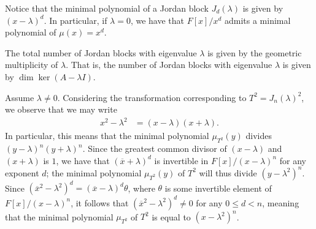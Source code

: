 \documentclass[10pt]{mypackage}
\begin{document}
Notice that the minimal polynomial of a Jordan block $J_d(\lambda)$ is given by $\left( x-\lambda \right)^{d}$. In particular, if $\lambda = 0$, we have that $F[x]/x^{d}$ admits a minimal polynomial of $\mu(x) = x^d$.
\begin{theorem}
  The total number of Jordan blocks with eigenvalue $\lambda$ is given by the geometric multiplicity of $\lambda$. That is, the number of Jordan blocks with eigenvalue $\lambda$ is given by $\dim\ker\left( A-\lambda I \right)$.
\end{theorem}
Assume $\lambda\neq 0$. Considering the transformation corresponding to $T^2 = J_n(\lambda)^2$, we observe that we may write
\begin{align*}
  x^2-\lambda^2 &= \left( x-\lambda \right)\left( x+\lambda \right).
\end{align*}
In particular, this means that the minimal polynomial $\mu_{T^2}(y)$ divides $\left( y-\lambda \right)^{n}\left( y+\lambda \right)^{n}$. Since the greatest common divisor of $\left( x-\lambda \right)$ and $\left( x+\lambda \right)$ is $1$, we have that $\left( \overline{x}+\lambda \right)^{d}$ is invertible in $F[x]/\left( x-\lambda \right)^{n}$ for any exponent $d$; the minimal polynomial $\mu_{T^2}(y)$ of $T^2$ will thus divide $\left( y-\lambda^2 \right)^{n}$. Since $\left( \overline{x}^2-\lambda^2 \right)^{d} = \left( \overline{x}-\lambda \right)^{d} \theta$, where $\theta$ is some invertible element of $F[x]/\left( x-\lambda \right)^{n}$, it follows that $\left( \overline{x}^2-\lambda^2 \right)^{d} \neq 0$ for any $0\leq d < n$, meaning that the minimal polynomial $\mu_{T^2}$ of $T^2$ is equal to $\left( x-\lambda^2 \right)^{n}$.
\end{document}
